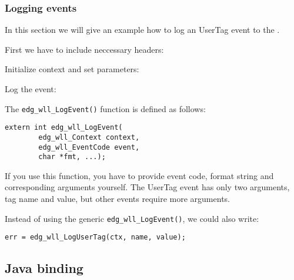 \subsubsection{Logging events}
In this section we will give an example how to log an UserTag event to
the \LB.

First we have to include neccessary headers:


Initialize context and set parameters:




Log the event:


The \verb'edg_wll_LogEvent()' function is defined as follows:
\begin{lstlisting}[numbers=none]
extern int edg_wll_LogEvent(
        edg_wll_Context context,
        edg_wll_EventCode event,
        char *fmt, ...);
\end{lstlisting}
If you use this function, you have to provide event code, format
string and corresponding arguments yourself. The UserTag event has
only two arguments, tag name and value, but other events require more
arguments. 

Instead of using the generic \verb'edg_wll_LogEvent()', we could also
write:
\begin{lstlisting}[firstnumber=92]
err = edg_wll_LogUserTag(ctx, name, value);
\end{lstlisting}

\subsection{Java binding}

